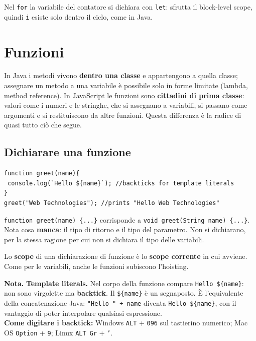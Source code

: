 \documentclass[10pt,a4paper]{article}
\newcommand{\nota}[1]{\textbf{\textcolor{ngreen}{Nota.}} #1}
\begin{document}
Nel \texttt{for} la variabile del contatore si dichiara con \texttt{let}: sfrutta il block-level scope, quindi \texttt{i} esiste solo dentro il ciclo, come in Java.

\section{Funzioni}

In Java i metodi vivono \textbf{dentro una classe} e appartengono a quella classe; assegnare un metodo a una variabile è possibile solo in forme limitate (lambda, method reference). In JavaScript le funzioni sono \textbf{cittadini di prima classe}: valori come i numeri e le stringhe, che si assegnano a variabili, si passano come argomenti e si restituiscono da altre funzioni. Questa differenza è la radice di quasi tutto ciò che segue.

\subsection{Dichiarare una funzione}

\begin{lstlisting}[style=js]
function greet(name){
 console.log(`Hello ${name}`); //backticks for template literals
}
greet("Web Technologies"); //prints "Hello Web Technologies"
\end{lstlisting}

\texttt{function greet(name) \{...\}} corrisponde a \texttt{void greet(String name) \{...\}}. Nota cosa \textbf{manca}: il tipo di ritorno e il tipo del parametro. Non si dichiarano, per la stessa ragione per cui non si dichiara il tipo delle variabili.

Lo \textbf{scope} di una dichiarazione di funzione è lo \textbf{scope corrente} in cui avviene. Come per le variabili, anche le funzioni subiscono l'hoisting.

\begin{notebox}
\nota{\textbf{Template literals.} Nel corpo della funzione compare \texttt{\textasciigrave Hello \$\{name\}\textasciigrave}: non sono virgolette ma \textbf{backtick}. Il \texttt{\$\{name\}} è un segnaposto. È l'equivalente della concatenazione Java: \texttt{"Hello " + name} diventa \texttt{\textasciigrave Hello \$\{name\}\textasciigrave}, con il vantaggio di poter interpolare qualsiasi espressione.\\[3pt]
\textbf{Come digitare i backtick:} Windows \texttt{ALT} + \texttt{096} sul tastierino numerico; Mac OS \texttt{Option} + \texttt{9}; Linux \texttt{ALT Gr} + \texttt{'}.}
\end{notebox}
\end{document}
